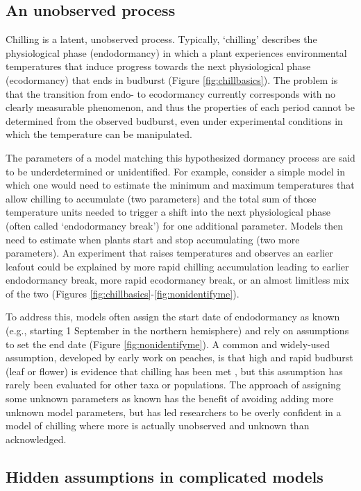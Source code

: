 \documentclass[11pt]{article}
\begin{document}
\subsection*{An unobserved process}

Chilling is a latent, unobserved process. Typically, 
`chilling' describes the physiological phase (endodormancy) in which a plant experiences environmental temperatures that induce progress towards the next physiological phase (ecodormancy) that ends in budburst (Figure \ref{fig:chillbasics}). The problem is that the transition from endo- to ecodormancy currently corresponds with no clearly measurable phenomenon, and thus the properties of each period cannot be determined from the observed budburst, even under experimental conditions in which the temperature can be manipulated. 

The parameters of a model matching this hypothesized dormancy process are said to be underdetermined or unidentified. For example, consider a simple model in which one would need to estimate the minimum and maximum temperatures that allow chilling to accumulate (two parameters) and the total sum of those temperature units needed to trigger a shift into the next physiological phase (often called `endodormancy break') for one additional parameter. Models then need to estimate when plants start and stop accumulating (two more parameters). An experiment that raises temperatures and observes an earlier leafout could be explained by more rapid chilling accumulation leading to earlier endodormancy break, more rapid ecodormancy break, or an almost limitless mix of the two (Figures \ref{fig:chillbasics}-\ref{fig:nonidentifyme}). 

To address this, models often assign the start date of endodormancy as known (e.g., starting 1 September in the northern hemisphere) and rely on assumptions to set the end date (Figure \ref{fig:nonidentifyme}). A common and widely-used assumption, developed by early work on peaches, is that high and rapid budburst (leaf or flower) is evidence that chilling has been met \citep[i.e. endodormancy has ended,][see also Figure \ref{fig:chillbasics}]{erez1971}, but this assumption has rarely been evaluated for other taxa or populations. The approach of assigning some unknown parameters as known has the benefit of avoiding adding more unknown model parameters, but has led researchers to be overly confident in a model of chilling where more is actually unobserved and unknown than acknowledged. 

\subsection*{Hidden assumptions in complicated models}
\end{document}
